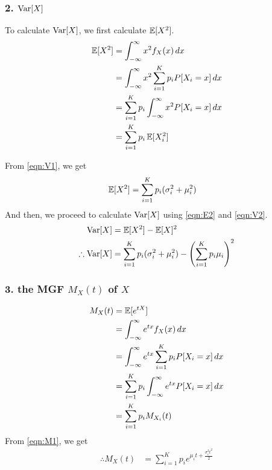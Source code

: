 \subsubsection*{2. $\operatorname{Var}[X]$}
To calculate $\operatorname{Var}[X]$, we first calculate $\operatorname{\mathbb{E}}[X^2]$.
\begin{align*}
	\operatorname{\mathbb{E}}[X^2] & = \int_{-\infty}^{\infty} x^2 f_X(x) \, dx                    \\
	         & = \int_{-\infty}^{\infty} x^2 \sum_{i=1}^K p_i P[X_i=x] \, dx \\
	         & = \sum_{i=1}^K p_i \int_{-\infty}^{\infty} x^2 P[X_i=x] \, dx \\
	         & = \sum_{i=1}^K p_i \operatorname{\mathbb{E}}[X_i^2]                                 \\
\end{align*}

From \cref{eqn:V1}, we get
\begin{align}
	\operatorname{\mathbb{E}}[X^2] & = \sum_{i=1}^K p_i (\sigma_i^2 + \mu_i^2) \label{eqn:V2}
\end{align}
And then, we proceed to calculate $\operatorname{Var}[X]$ using \cref{eqn:E2} and \cref{eqn:V2}.
\begin{align}
	\operatorname{Var}[X]            & = \operatorname{\mathbb{E}}[X^2] - \operatorname{\mathbb{E}}[X]^2                                                             \nonumber      \\
	\therefore \operatorname{Var}[X] & = \sum_{i=1}^K p_i (\sigma_i^2 + \mu_i^2) - \left(\sum_{i=1}^K p_i \mu_i\right)^2 \label{eqn:V3}
\end{align}

\subsubsection*{3. \normalfont the MGF $M_X(t)$ of $X$}
\begin{align*}
	M_X(t) & = \operatorname{\mathbb{E}}[e^{tX}]                                                    \\
	       & = \int_{-\infty}^{\infty} e^{tx} f_X(x) \, dx                    \\
	       & = \int_{-\infty}^{\infty} e^{tx} \sum_{i=1}^K p_i P[X_i=x] \, dx \\
	       & = \sum_{i=1}^K p_i \int_{-\infty}^{\infty} e^{tx} P[X_i=x] \, dx \\
	       & = \sum_{i=1}^K p_i M_{X_i}(t)
\end{align*}
From \cref{eqn:M1}, we get
\begin{align}
	\therefore M_X(t) & = \sum_{i=1}^K p_i e^{\mu_i t + \frac{\sigma_i^2 t^2}{2}} \label{eqn:M2}
\end{align}

